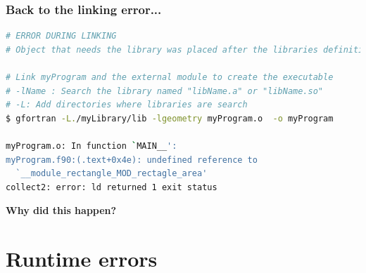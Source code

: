 \documentclass[t]{myBeamer}
\begin{document}
\begin{frame}[fragile, t]
\frametitle{ \huge Back to the linking error... }
\footnotesize
\vspace{-12pt}
\begin{lstlisting}[language=bash]
# ERROR DURING LINKING
# Object that needs the library was placed after the libraries definitions.

# Link myProgram and the external module to create the executable
# -lName : Search the library named "libName.a" or "libName.so"
# -L: Add directories where libraries are search
$ gfortran -L./myLibrary/lib -lgeometry myProgram.o  -o myProgram

myProgram.o: In function `MAIN__':
myProgram.f90:(.text+0x4e): undefined reference to
  `__module_rectangle_MOD_rectagle_area'
collect2: error: ld returned 1 exit status
\end{lstlisting}
\begin{tightBox}
 \centering \huge \textbf{Why did this happen?}
\end{tightBox}


\end{frame}











\section{Runtime errors} 
\end{document}
